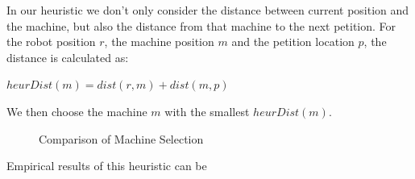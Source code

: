 In our heuristic we don't only consider the distance between current position and the machine, but also the distance from that machine to the next petition. For the robot position $r$, the machine position $m$ and the petition location $p$, the distance is calculated as:

$heurDist(m)  = dist(r, m) + dist(m, p)$

We then choose the machine $m$ with the smallest $heurDist(m)$.

\begin{figure}[!ht]
\centering     %
{}
\caption{Comparison of Machine Selection}
\label{fig:2}
\end{figure}

Empirical results of this heuristic can be 


